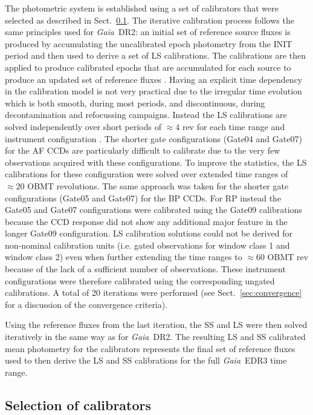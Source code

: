 \documentclass{aa}
\newcommand{\gaia}{\textit{Gaia}\xspace}
\newcommand{\drt}{\gaia~DR2\xspace}
\newcommand{\edr}{\gaia~EDR3\xspace}
\newcommand{\secname}{Sect.}
\newcommand{\secref}[1]{\secname~\ref{sec:#1}}
\begin{document}
The photometric system is established using a set of calibrators that were selected as described in \secref{standards}. The iterative calibration process follows the same principles used for \drt: an initial set of reference source fluxes is produced by accumulating the uncalibrated epoch photometry from the INIT period and then used to derive a set of LS calibrations. The calibrations are then applied to produce calibrated epochs that are accumulated for each source to produce an updated set of reference fluxes \citep[see][for more details]{Proc_DR2, PhotCore}. Having an explicit time dependency in the calibration model is not very practical due to the irregular time evolution which is both smooth, during most periods, and discontinuous, during decontamination and refocussing campaigns. Instead the LS calibrations are solved independently over short periods of $\approx4$ rev for each time range and instrument configuration \citep[see][for more information]{Proc_DR2}. 
The shorter gate configurations (Gate04 and Gate07) for the AF CCDs are particularly difficult to calibrate due to the very few observations acquired with these configurations. To improve the statistics, the LS calibrations for these configuration were solved over extended time ranges of $\approx20$ OBMT revolutions. The same approach was taken for the shorter gate configurations (Gate05 and Gate07) for the BP CCDs. For RP instead the Gate05 and Gate07 configurations were calibrated using the Gate09 calibrations because the CCD response did not show any additional major feature in the longer Gate09 configuration. 
LS calibration solutions could not be derived for non-nominal calibration units (i.e. gated observations for window class 1 and window class 2) even when further extending the time ranges to $\approx60$ OBMT rev because of the lack of a sufficient number of observations. These instrument configurations were therefore calibrated using the corresponding ungated calibrations.
%
A total of 20 iterations were performed (see \secref{convergence} for a discussion of the convergence criteria).

Using the reference fluxes from the last iteration, the SS and LS were then solved iteratively in the same way as for \drt \citep{Proc_DR2}. The resulting LS and SS calibrated mean photometry for the calibrators represents the final set of reference fluxes used to then derive the LS and SS calibrations for the full \edr time range.

\subsection{Selection of calibrators}\label{sec:standards}
\end{document}
